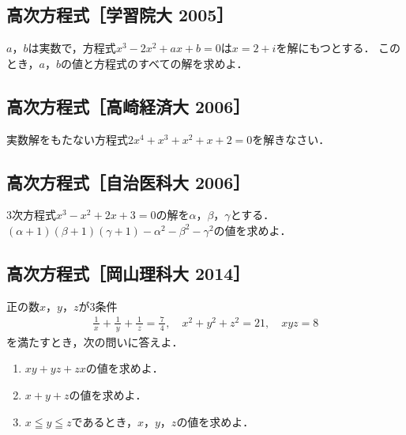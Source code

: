 \documentclass[../all/math-standard_questions_all.tex]{subfiles}
\begin{document}
\vspace{2cm}
\vfill

\subsection{高次方程式［学習院大 2005］}

$a$，$b$は実数で，方程式$x^3-2x^2+ax+b=0$は$x=2+i$を解にもつとする．
このとき，$a$，$b$の値と方程式のすべての解を求めよ．

\vspace{2cm}
\vfill

\subsection{高次方程式［高崎経済大 2006］}

実数解をもたない方程式$2x^4+x^3+x^2+x+2=0$を解きなさい．

\vspace{2cm}
\vfill

\subsection{高次方程式［自治医科大 2006］}

3次方程式$x^3-x^2+2x+3=0$の解を$\alpha$，$\beta$，$\gamma$とする．
$(\alpha+1)(\beta+1)(\gamma+1)-\alpha^2-\beta^2-\gamma^2$の値を求めよ．

\vspace{2cm}
\vfill

\subsection{高次方程式［岡山理科大 2014］}

正の数$x$，$y$，$z$が3条件
\begin{align*}
    \frac{\,1\,}{x}+\frac{\,1\,}{y}+\frac{\,1\,}{z}=\frac{\,7\,}{4}, \quad
    x^2+y^2+z^2=21, \quad xyz=8    
\end{align*}
を満たすとき，次の問いに答えよ．

\begin{enumerate}

    \item $xy+yz+zx$の値を求めよ．

    \item $x+y+z$の値を求めよ．
    
    \item $x\leqq y\leqq z$であるとき，$x$，$y$，$z$の値を求めよ．
    
\end{enumerate}
\end{document}
